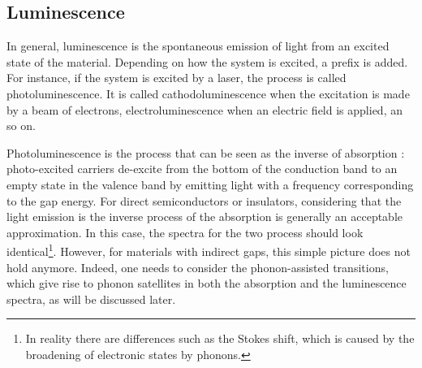 \subsection{Luminescence}
In general, luminescence is the spontaneous emission of light from an excited state of the material. Depending on how the system is excited, a prefix is added. For instance, if the system is excited by a laser, the process is called photoluminescence. It is called cathodoluminescence when the excitation is made by a beam of electrons, electroluminescence when an electric field is applied, an so on.\cite{pelant2012luminescence} 

Photoluminescence is the process that can be seen as the inverse of absorption : photo-excited carriers de-excite from the bottom of the conduction band to an empty state in the valence band by emitting light with a frequency corresponding to the gap energy. For direct semiconductors or insulators, considering that the light emission is the inverse process of the absorption is generally an acceptable approximation. In this case, the spectra for the two process should look identical\footnote[1]{In reality there are differences such as the Stokes shift, which is caused by the broadening of electronic states by phonons.}. However, for materials with indirect gaps, this simple picture does not hold anymore. Indeed, one needs to consider the phonon-assisted transitions, which give rise to phonon satellites in both the absorption and the luminescence spectra, as will be discussed later. \\

